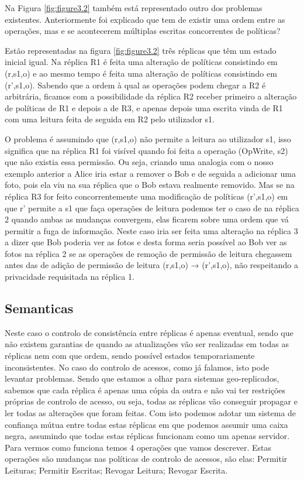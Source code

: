 \documentclass[runningheads,a4paper]{llncs}
\begin{document}
Na Figura \ref{fig:figure3.2} também está representado outro dos problemas existentes. Anteriormente foi explicado que tem de existir uma ordem entre as operações, mas e se acontecerem múltiplas escritas concorrentes de políticas?

Estão representadas na figura \ref{fig:figure3.2} três réplicas que têm um estado inicial igual. Na réplica R1 é feita uma alteração de políticas consistindo em (r,s1,o) e ao mesmo tempo é feita uma alteração de políticas consistindo em (r',s1,o). Sabendo que a ordem à qual as operações podem chegar a R2 é arbitrária, ficamos com a possibilidade da réplica R2 receber primeiro a alteração de políticas de R1 e depois a de R3, e apenas depois uma escrita vinda de R1 com uma leitura feita de seguida em R2 pelo utilizador s1.

O problema é assumindo que (r,s1,o) não permite a leitura ao utilizador s1, isso significa que na réplica R1 foi visível quando foi feita a operação (OpWrite, s2) que não existia essa permissão. Ou seja, criando uma analogia com o nosso exemplo anterior a Alice iria estar a remover o Bob e de seguida a adicionar uma foto, pois ela viu na sua réplica que o Bob estava realmente removido. Mas se na réplica R3 for feito concorrentemente uma modificação de políticas (r',s1,o) em que r' permite a s1 que faça operações de leitura podemos ter o caso de na réplica 2 quando ambas as mudanças convergem, elas ficarem sobre uma ordem que vá permitir a fuga de informação. Neste caso iria ser feita uma alteração na réplica 3 a dizer que Bob poderia ver as fotos e desta forma seria possível ao Bob ver as fotos na réplica 2 se as operações de remoção de permissão de leitura chegassem antes das de adição de permissão de leitura (r,s1,o) → (r',s1,o), não respeitando a privacidade requisitada na réplica 1.

\subsection{Semanticas} \label{semantics}

Neste caso o controlo de consistência entre réplicas é apenas eventual, sendo que não existem garantias de quando as atualizações vão ser realizadas em todas as réplicas nem com que ordem, sendo possível estados temporariamente inconsistentes.
No caso do controlo de acessos, como já falamos, isto pode levantar problemas. 
Sendo que estamos a olhar para sistemas geo-replicados, sabemos que cada réplica é apenas uma cópia da outra e não vai ter restrições próprias de controlo de acesso, ou seja, todas as réplicas vão conseguir propagar e ler todas as alterações que foram feitas. Com isto podemos adotar um sistema de confiança mútua entre todas estas réplicas em que podemos assumir uma caixa negra, assumindo que todas estas réplicas funcionam como um apenas servidor.
Para vermos como funciona temos 4 operações que vamos descrever. Estas operações são mudanças nas políticas de controlo de acessos, são elas: Permitir Leituras; Permitir Escritas; Revogar Leitura; Revogar Escrita.
\end{document}
